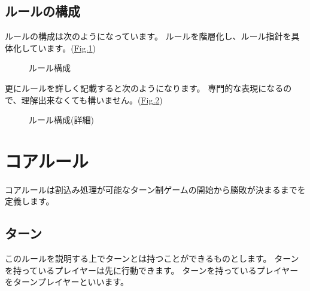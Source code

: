 \documentclass[letterpaper,10pt,dvipdfmx]{sphinxmanual}
\begin{document}
\section{ルールの構成}
\label{\detokenize{init/init:rule-constract}}\label{\detokenize{init/init:id7}}
\sphinxAtStartPar
ルールの構成は次のようになっています。
ルールを階層化し、ルール指針を具体化しています。(\hyperref[\detokenize{init/init:rule-puml}]{Fig.\@ \ref{\detokenize{init/init:rule-puml}}})

\begin{figure}[htbp]
\centering
\capstart

\noindent{}
\caption{ルール構成}\label{\detokenize{init/init:id9}}\label{\detokenize{init/init:rule-puml}}\end{figure}

\sphinxAtStartPar
更にルールを詳しく記載すると次のようになります。
専門的な表現になるので、理解出来なくても構いません。(\hyperref[\detokenize{init/init:rule-class-puml}]{Fig.\@ \ref{\detokenize{init/init:rule-class-puml}}})

\begin{figure}[htbp]
\centering
\capstart

\noindent{}
\caption{ルール構成(詳細)}\label{\detokenize{init/init:id10}}\label{\detokenize{init/init:rule-class-puml}}\end{figure}

\sphinxstepscope


\chapter{コアルール}
\label{\detokenize{core/core:core-rst}}\label{\detokenize{core/core:id1}}\label{\detokenize{core/core::doc}}
\sphinxAtStartPar
コアルールは割込み処理が可能なターン制ゲームの開始から勝敗が決まるまでを定義します。

\ignorespaces 

\section{ターン}
\label{\detokenize{core/core:index-0}}\label{\detokenize{core/core:id2}}
\sphinxAtStartPar
このルールを説明する上でターンとは持つことができるものとします。
ターンを持っているプレイヤーは先に行動できます。
ターンを持っているプレイヤーをターンプレイヤーといいます。
\end{document}
